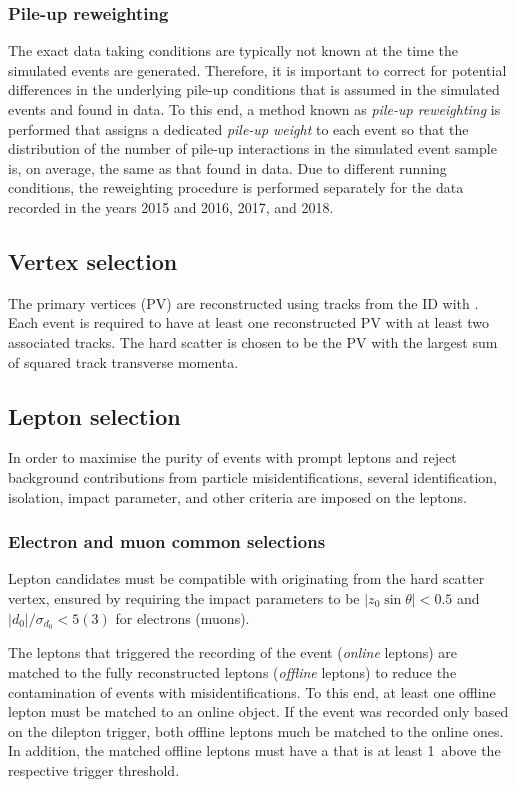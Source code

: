 \subsubsection{Pile-up reweighting}
The exact data taking conditions are typically not known at the time the simulated events are generated.
Therefore, it is important to correct for potential differences in the underlying pile-up conditions that is assumed in the simulated events and found in data.
To this end, a method known as \emph{pile-up reweighting} is performed that assigns a dedicated \emph{pile-up weight} to each event so that the distribution of the number of pile-up interactions in the simulated event sample is, on average, the same as that found in data. Due to different running conditions, the reweighting procedure is performed separately for the data recorded in the years 2015 and 2016, 2017, and 2018.


\subsection{Vertex selection}
The primary vertices (PV) are reconstructed using tracks from the ID with \MeV. Each event is required to have at least one reconstructed PV with at least two associated tracks. The hard scatter is chosen to be the PV with the largest sum of squared track transverse momenta.


\subsection{Lepton selection}
In order to maximise the purity of events with prompt leptons and reject background contributions from particle misidentifications, several identification, isolation, impact parameter, and other criteria are imposed on the leptons.

\subsubsection{Electron and muon common selections}
Lepton candidates must be compatible with originating from the hard scatter vertex, ensured by requiring the impact parameters to be $|z_0\sin\theta|<0.5$ and $|d_0| / \sigma_{d_0} < 5 (3)$ for electrons (muons).

The leptons that triggered the recording of the event (\emph{online} leptons) are matched to the fully reconstructed leptons (\emph{offline} leptons) to reduce the contamination of events with misidentifications.
To this end, at least one offline lepton must be matched to an online object.
If the event was recorded only based on the dilepton trigger, both offline leptons much be matched to the online ones.
In addition, the matched offline leptons must have a \pT that is at least 1\GeV\ above the respective trigger threshold.


